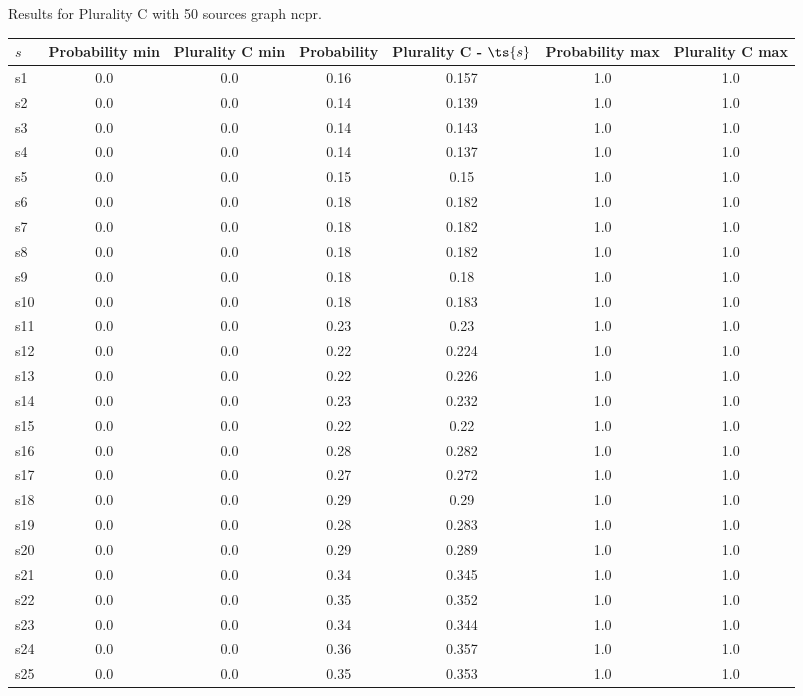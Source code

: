 \documentclass{article}
\begin{document}
\noindent Results for Plurality C with 50 sources graph ncpr.

\noindent\begin{tabular}{|l|c|c|c|c|c|c|}
\hline
$s$& Probability min & Plurality C min & Probability & Plurality C - $\ts{s}$ & Probability max & Plurality C max\\
\hline
s1 &0.0 & 0.0 & 0.16 & 0.157 & 1.0 & 1.0\\
\hline
s2 &0.0 & 0.0 & 0.14 & 0.139 & 1.0 & 1.0\\
\hline
s3 &0.0 & 0.0 & 0.14 & 0.143 & 1.0 & 1.0\\
\hline
s4 &0.0 & 0.0 & 0.14 & 0.137 & 1.0 & 1.0\\
\hline
s5 &0.0 & 0.0 & 0.15 & 0.15 & 1.0 & 1.0\\
\hline
s6 &0.0 & 0.0 & 0.18 & 0.182 & 1.0 & 1.0\\
\hline
s7 &0.0 & 0.0 & 0.18 & 0.182 & 1.0 & 1.0\\
\hline
s8 &0.0 & 0.0 & 0.18 & 0.182 & 1.0 & 1.0\\
\hline
s9 &0.0 & 0.0 & 0.18 & 0.18 & 1.0 & 1.0\\
\hline
s10 &0.0 & 0.0 & 0.18 & 0.183 & 1.0 & 1.0\\
\hline
s11 &0.0 & 0.0 & 0.23 & 0.23 & 1.0 & 1.0\\
\hline
s12 &0.0 & 0.0 & 0.22 & 0.224 & 1.0 & 1.0\\
\hline
s13 &0.0 & 0.0 & 0.22 & 0.226 & 1.0 & 1.0\\
\hline
s14 &0.0 & 0.0 & 0.23 & 0.232 & 1.0 & 1.0\\
\hline
s15 &0.0 & 0.0 & 0.22 & 0.22 & 1.0 & 1.0\\
\hline
s16 &0.0 & 0.0 & 0.28 & 0.282 & 1.0 & 1.0\\
\hline
s17 &0.0 & 0.0 & 0.27 & 0.272 & 1.0 & 1.0\\
\hline
s18 &0.0 & 0.0 & 0.29 & 0.29 & 1.0 & 1.0\\
\hline
s19 &0.0 & 0.0 & 0.28 & 0.283 & 1.0 & 1.0\\
\hline
s20 &0.0 & 0.0 & 0.29 & 0.289 & 1.0 & 1.0\\
\hline
s21 &0.0 & 0.0 & 0.34 & 0.345 & 1.0 & 1.0\\
\hline
s22 &0.0 & 0.0 & 0.35 & 0.352 & 1.0 & 1.0\\
\hline
s23 &0.0 & 0.0 & 0.34 & 0.344 & 1.0 & 1.0\\
\hline
s24 &0.0 & 0.0 & 0.36 & 0.357 & 1.0 & 1.0\\
\hline
s25 &0.0 & 0.0 & 0.35 & 0.353 & 1.0 & 1.0\\

\end{tabular}
\end{document}
